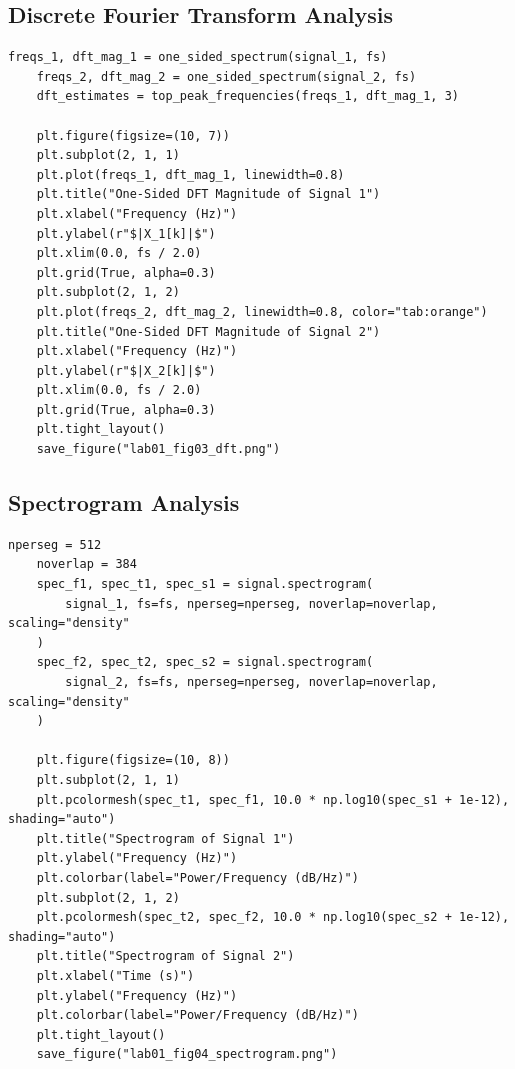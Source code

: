 \documentclass[12pt, a4paper]{article}
\begin{document}
\subsection{Discrete Fourier Transform Analysis}
\begin{lstlisting}[caption={DFT computation and peak extraction for Lab 01.}, label={lst:lab01_dft}]
    freqs_1, dft_mag_1 = one_sided_spectrum(signal_1, fs)
    freqs_2, dft_mag_2 = one_sided_spectrum(signal_2, fs)
    dft_estimates = top_peak_frequencies(freqs_1, dft_mag_1, 3)

    plt.figure(figsize=(10, 7))
    plt.subplot(2, 1, 1)
    plt.plot(freqs_1, dft_mag_1, linewidth=0.8)
    plt.title("One-Sided DFT Magnitude of Signal 1")
    plt.xlabel("Frequency (Hz)")
    plt.ylabel(r"$|X_1[k]|$")
    plt.xlim(0.0, fs / 2.0)
    plt.grid(True, alpha=0.3)
    plt.subplot(2, 1, 2)
    plt.plot(freqs_2, dft_mag_2, linewidth=0.8, color="tab:orange")
    plt.title("One-Sided DFT Magnitude of Signal 2")
    plt.xlabel("Frequency (Hz)")
    plt.ylabel(r"$|X_2[k]|$")
    plt.xlim(0.0, fs / 2.0)
    plt.grid(True, alpha=0.3)
    plt.tight_layout()
    save_figure("lab01_fig03_dft.png")
\end{lstlisting}

\subsection{Spectrogram Analysis}
\begin{lstlisting}[caption={Spectrogram analysis for both Lab 01 signals.}, label={lst:lab01_spec}]
    nperseg = 512
    noverlap = 384
    spec_f1, spec_t1, spec_s1 = signal.spectrogram(
        signal_1, fs=fs, nperseg=nperseg, noverlap=noverlap, scaling="density"
    )
    spec_f2, spec_t2, spec_s2 = signal.spectrogram(
        signal_2, fs=fs, nperseg=nperseg, noverlap=noverlap, scaling="density"
    )

    plt.figure(figsize=(10, 8))
    plt.subplot(2, 1, 1)
    plt.pcolormesh(spec_t1, spec_f1, 10.0 * np.log10(spec_s1 + 1e-12), shading="auto")
    plt.title("Spectrogram of Signal 1")
    plt.ylabel("Frequency (Hz)")
    plt.colorbar(label="Power/Frequency (dB/Hz)")
    plt.subplot(2, 1, 2)
    plt.pcolormesh(spec_t2, spec_f2, 10.0 * np.log10(spec_s2 + 1e-12), shading="auto")
    plt.title("Spectrogram of Signal 2")
    plt.xlabel("Time (s)")
    plt.ylabel("Frequency (Hz)")
    plt.colorbar(label="Power/Frequency (dB/Hz)")
    plt.tight_layout()
    save_figure("lab01_fig04_spectrogram.png")
\end{lstlisting}
\end{document}
